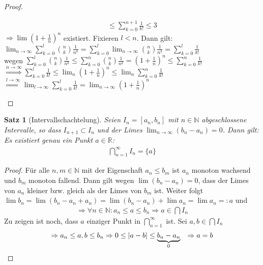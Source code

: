 \documentclass[ngerman,titlepage,twoside, parskip=half*]{scrreprt}
\newcommand*{\N}{\mathbb{N}}
\newcommand*{\R}{\mathbb{R}}
\theoremstyle{break}
\newtheorem{theorem}{Satz}[section]
\theoremstyle{nonumberbreak}
\newtheorem{proof}{Beweis:}
\DeclarePairedDelimiter{\abs}{\lvert}{\rvert}
\begin{document}
\begin{proof}
\begin{enumerate}
\begin{gather*}
    \leq \sum_{k=0}^{n+1} \frac{1}{k!} \leq 3\end{gather*}
    $\Rightarrow \lim \left(1+\frac{1}{n}\right)^n$ existiert. Fixieren $l<n$.
    Dann gilt:\\
    $\lim_{n \rightarrow \infty} \sum_{k=0}^l \binom{n}{k} \frac{1}{n^k}
    = \sum_{k=0}^l \lim_{n \rightarrow \infty} \binom{n}{k} \frac{1}{n^k} = 
    \sum_{k=0}^l \frac{1}{k!}$\\
    wegen $\sum_{k=0}^l \binom{n}{k} \frac{1}{n^k}
    \leq \sum_{k=0}^n \binom{n}{k} \frac{1}{n^k}=\left( 1+\frac{1}{n}\right)^n
    \leq \sum_{k=0}^n \frac{1}{k!}$\\
    $\overset{n \rightarrow \infty}{\Rightarrow}\sum_{k=0}^l \frac{1}{k!} \leq
    \lim_n \left(1+\frac{1}{n}\right)^n \leq \lim_n \sum_{k=0}^n \frac{1}{k!}$\\
    $\overset{l \rightarrow \infty}{\Rightarrow} \lim_{l \rightarrow \infty}
    \sum_{k=0}^l \frac{1}{k!} = \lim_{n \rightarrow \infty} \left(1+\frac{1}{n}
    \right)^n$
\end{enumerate}
\end{proof}

\begin{theorem}[Intervallschachtelung]
  \label{satz:Ischachtelung}
  Seien $I_n=[a_n,b_n]$ mit $n \in \N$ abgeschlossene Intervalle, so
  dass $I_{n+1} \subset I_n$ und der Limes $\lim_{n \rightarrow \infty}
  (b_n-a_n)=0$. Dann gilt: Es existiert genau ein Punkt $a \in \R$:
  \begin{gather*}\bigcap_{n=1}^{\infty} I_n = \{a\}\end{gather*}
\end{theorem}
\begin{proof}
  Für alle $n,m \in \N$ mit der Eigenschaft $a_n \leq b_m$ ist $a_n $
  monoton wachsend und $b_m$ monoton fallend. Dann gilt wegen $\lim
  (b_n-a_n)=0$, dass der Limes von $a_n$ kleiner bzw. gleich als der
  Limes von $b_m$ ist. Weiter folgt $\lim b_n = \lim
  (b_n-a_n+a_n)=\lim(b_n-a_n)+\lim a_n=\lim a_n=:a$ und
  \begin{gather*}\Rightarrow \forall n \in \N \colon a_n \leq a \leq b_n \Rightarrow a \in
  \bigcap I_n\end{gather*}
  Zu zeigen ist noch, dass $a$ einziger Punkt in
  $\bigcap_{n=1}^\infty$ ist. Sei $a,b \in \bigcap I_n$
\begin{align*}
  \Rightarrow a_n \leq a,b \leq b_n & \Rightarrow 0 \leq \abs{a-b} \leq
  \underbrace{b_n-a_n}_{0} & \Rightarrow a = b
\end{align*}
\end{proof}
\end{document}
